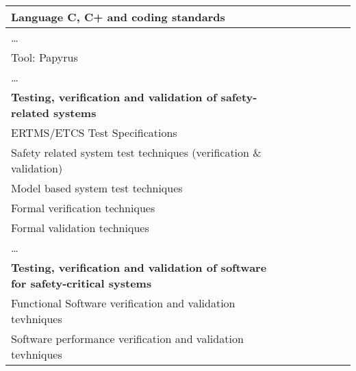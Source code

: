 \documentclass[a4paper, 11pt]{article}
\begin{document}
\begin{center}
\begin{longtable}{|r|r|r|r|r|r|r|r|}
    \hline
    \multicolumn{1}{|l|}{Language C, C+ and coding standards} & \multicolumn{1}{l|}{} &       &       &       &       &       &  \bigstrut\\
    \hline
    \multicolumn{1}{|l|}{…} & \multicolumn{1}{l|}{} &       &       &       &       &       &  \bigstrut\\
    \hline
    \multicolumn{1}{|l|}{Tool: Papyrus} & \multicolumn{1}{l|}{} &       &       &       &       &       &  \bigstrut\\
    \hline
    \multicolumn{1}{|l|}{…} & \multicolumn{1}{l|}{} &       &       &       &       &       &  \bigstrut[t]\\
    \multicolumn{1}{|l|}{\textbf{Testing, verification and validation of safety-related systems}} & \multicolumn{1}{l|}{\textbf{}} &       &       &       &       &       &  \\
    \multicolumn{1}{|l|}{ERTMS/ETCS Test Specifications} & \multicolumn{1}{l|}{} &       &       &       &       &       &  \bigstrut[b]\\
    \hline
    \multicolumn{1}{|l|}{Safety related system test techniques (verification \& validation)} & \multicolumn{1}{l|}{} &       &       &       &       &       &  \bigstrut\\
    \hline
    \multicolumn{1}{|l|}{Model based system test techniques } & \multicolumn{1}{l|}{} &       &       &       &       &       &  \bigstrut\\
    \hline
    \multicolumn{1}{|l|}{Formal verification techniques} & \multicolumn{1}{l|}{} &       &       &       &       &       &  \bigstrut\\
    \hline
    \multicolumn{1}{|l|}{Formal validation techniques} & \multicolumn{1}{l|}{} &       &       &       &       &       &  \bigstrut\\
    \hline
    \multicolumn{1}{|l|}{…} & \multicolumn{1}{l|}{} &       &       &       &       &       &  \bigstrut[t]\\
    \multicolumn{1}{|l|}{\textbf{Testing, verification and validation of software for safety-critical systems}} & \multicolumn{1}{l|}{\textbf{}} &       &       &       &       &       &  \\
    \multicolumn{1}{|l|}{Functional Software verification and validation tevhniques} & \multicolumn{1}{l|}{} &       &       &       &       &       &  \bigstrut[b]\\
    \hline
    \multicolumn{1}{|l|}{Software performance verification and validation tevhniques} & \multicolumn{1}{l|}{} &       &       &       &       &       &  \bigstrut\\

\end{longtable}
\end{center}
\end{document}
